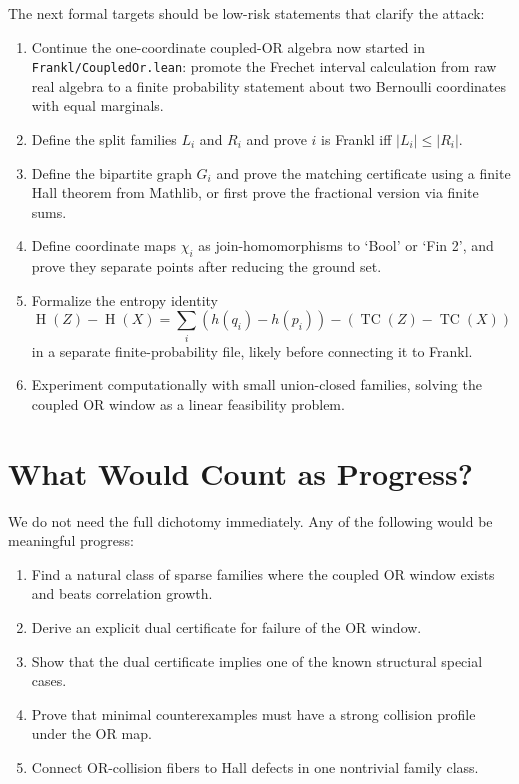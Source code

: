 \documentclass[11pt]{article}
\DeclareMathOperator{\TC}{TC}
\DeclareMathOperator{\Ent}{H}
\begin{document}
The next formal targets should be low-risk statements that clarify the attack:
\begin{enumerate}
  \item Continue the one-coordinate coupled-OR algebra now started in
  \texttt{Frankl/CoupledOr.lean}: promote the Frechet interval calculation
  from raw real algebra to a finite probability statement about two
  Bernoulli coordinates with equal marginals.
  \item Define the split families $L_i$ and $R_i$ and prove
  $i$ is Frankl iff $|L_i|\leq |R_i|$.
  \item Define the bipartite graph $G_i$ and prove the matching certificate
  using a finite Hall theorem from Mathlib, or first prove the fractional
  version via finite sums.
  \item Define coordinate maps $\chi_i$ as join-homomorphisms to `Bool' or
  `Fin 2', and prove they separate points after reducing the ground set.
  \item Formalize the entropy identity
  \[
    \Ent(Z)-\Ent(X)
    =
    \sum_i(h(q_i)-h(p_i))-(\TC(Z)-\TC(X))
  \]
  in a separate finite-probability file, likely before connecting it to
  Frankl.
  \item Experiment computationally with small union-closed families, solving
  the coupled OR window as a linear feasibility problem.
\end{enumerate}

\section{What Would Count as Progress?}

We do not need the full dichotomy immediately.  Any of the following would be
meaningful progress:
\begin{enumerate}
  \item Find a natural class of sparse families where the coupled OR window
  exists and beats correlation growth.
  \item Derive an explicit dual certificate for failure of the OR window.
  \item Show that the dual certificate implies one of the known structural
  special cases.
  \item Prove that minimal counterexamples must have a strong collision
  profile under the OR map.
  \item Connect OR-collision fibers to Hall defects in one nontrivial family
  class.
\end{enumerate}
\end{document}
